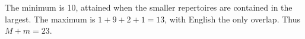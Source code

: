 The minimum is 10, attained when the smaller repertoires are contained in the largest. The maximum is $ 1+9+2+1=13 $, with English the only overlap. Thus $\boxed{M+m=23}$.
